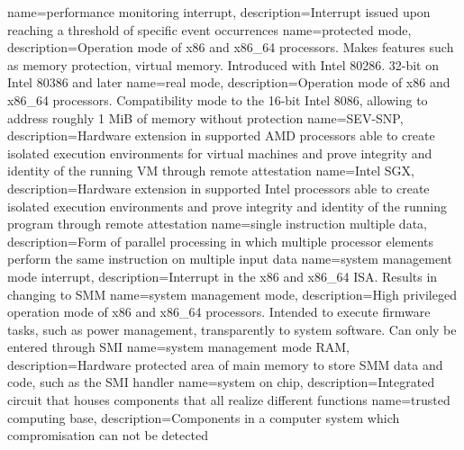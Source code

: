 {
    name=performance monitoring interrupt,
    description={Interrupt issued upon reaching a threshold of specific event occurrences}
}
{
    name=protected mode,
    description={Operation mode of x86 and x86\_64 processors. Makes features such as memory protection, virtual memory.
            Introduced with Intel 80286. 32-bit on Intel 80386 and later}
}
%
{
    name=real mode,
    description={Operation mode of x86 and x86\_64 processors. Compatibility mode to the 16-bit Intel 8086, allowing to
            address roughly 1 MiB of memory without protection}
}
%
{
    name=SEV-SNP,
    description={Hardware extension in supported AMD processors able to create isolated execution environments for
            virtual machines and prove integrity and identity of the running VM through remote attestation}
}
{
    name=Intel SGX,
    description={Hardware extension in supported Intel processors able to create isolated execution environments and
            prove integrity and identity of the running program through remote attestation}
}
{
    name={single instruction multiple data},
    description={Form of parallel processing in which multiple processor elements perform the same instruction on
            multiple input data}
}
{
    name=system management mode interrupt,
    description={Interrupt in the x86 and x86\_64 ISA. Results in changing to SMM}
}
{
    name=system management mode,
    description={High privileged operation mode of x86 and x86\_64 processors. Intended to execute firmware tasks, such
            as power management, transparently to system software. Can only be entered through SMI}
}
{
    name=system management mode RAM,
    description={Hardware protected area of main memory to store SMM data and code, such as the
            SMI handler}
}
{
    name=system on chip,
    description={Integrated circuit that houses components that all realize different functions}
}
%
{
    name=trusted computing base,
    description={Components in a computer system which compromisation can not be detected}
}
